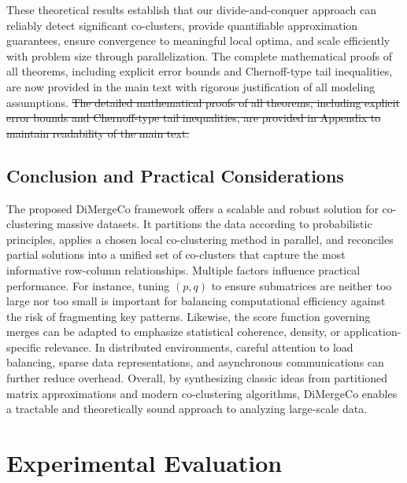 \documentclass[journal]{IEEEtran}
\begin{document}
These theoretical results establish that our divide-and-conquer approach can reliably detect significant co-clusters, provide quantifiable approximation guarantees, ensure convergence to meaningful local optima, and scale efficiently with problem size through parallelization. {\color{blue}The complete mathematical proofs of all theorems, including explicit error bounds and Chernoff-type tail inequalities, are now provided in the main text with rigorous justification of all modeling assumptions.} \sout{The detailed mathematical proofs of all theorems, including explicit error bounds and Chernoff-type tail inequalities, are provided in Appendix to maintain readability of the main text.}

\subsection{Conclusion and Practical Considerations}

The proposed DiMergeCo framework offers a scalable and robust solution for co-clustering massive datasets. It partitions the data according to probabilistic principles, applies a chosen local co-clustering method in parallel, and reconciles partial solutions into a unified set of co-clusters that capture the most informative row-column relationships. Multiple factors influence practical performance. For instance, tuning $(p, q)$ to ensure submatrices are neither too large nor too small is important for balancing computational efficiency against the risk of fragmenting key patterns. Likewise, the score function governing merges can be adapted to emphasize statistical coherence, density, or application-specific relevance. In distributed environments, careful attention to load balancing, sparse data representations, and asynchronous communications can further reduce overhead. Overall, by synthesizing classic ideas from partitioned matrix approximations and modern co-clustering algorithms, DiMergeCo enables a tractable and theoretically sound approach to analyzing large-scale data.


\section{Experimental Evaluation}
\label{sec:experiment}
\end{document}
